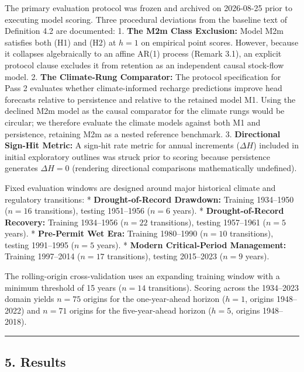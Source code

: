 \documentclass[11pt]{article}
\begin{document}
The primary evaluation protocol was frozen and archived on 2026-08-25
prior to executing model scoring. Three procedural deviations from the
baseline text of Definition 4.2 are documented: 1. \textbf{The M2m Class
Exclusion:} Model M2m satisfies both (H1) and (H2) at \(h=1\) on
empirical point scores. However, because it collapses algebraically to
an affine AR(1) process (Remark 3.1), an explicit protocol clause
excludes it from retention as an independent causal stock-flow model. 2.
\textbf{The Climate-Rung Comparator:} The protocol specification for
Pass 2 evaluates whether climate-informed recharge predictions improve
head forecasts relative to persistence and relative to the retained
model M1. Using the declined M2m model as the causal comparator for the
climate rungs would be circular; we therefore evaluate the climate
models against both M1 and persistence, retaining M2m as a nested
reference benchmark. 3. \textbf{Directional Sign-Hit Metric:} A sign-hit
rate metric for annual increments (\(\Delta H\)) included in initial
exploratory outlines was struck prior to scoring because persistence
generates \(\Delta H = 0\) (rendering directional comparisons
mathematically undefined).

Fixed evaluation windows are designed around major historical climate
and regulatory transitions: * \textbf{Drought-of-Record Drawdown:}
Training 1934--1950 (\(n=16\) transitions), testing 1951--1956 (\(n=6\)
years). * \textbf{Drought-of-Record Recovery:} Training 1934--1956
(\(n=22\) transitions), testing 1957--1961 (\(n=5\) years). *
\textbf{Pre-Permit Wet Era:} Training 1980--1990 (\(n=10\) transitions),
testing 1991--1995 (\(n=5\) years). * \textbf{Modern Critical-Period
Management:} Training 1997--2014 (\(n=17\) transitions), testing
2015--2023 (\(n=9\) years).

The rolling-origin cross-validation uses an expanding training window
with a minimum threshold of 15 years (\(n=14\) transitions). Scoring
across the 1934--2023 domain yields \(n = 75\) origins for the
one-year-ahead horizon (\(h=1\), origins 1948--2022) and \(n = 71\)
origins for the five-year-ahead horizon (\(h=5\), origins 1948--2018).

\begin{center}\rule{0.5\linewidth}{0.5pt}\end{center}

\subsection{5. Results}\label{results}
\end{document}
